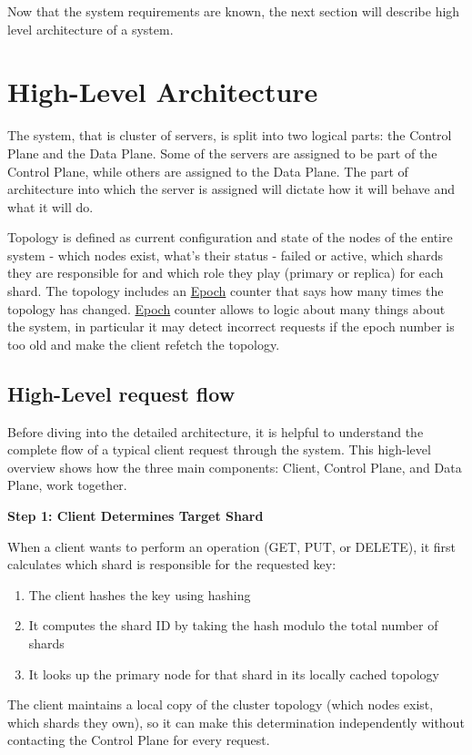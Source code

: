 \documentclass[shortabstract]{iithesis}
\begin{document}
Now that the system requirements are known, the next section will describe high level architecture of a system. 

\section{High-Level Architecture}
The system, that is cluster of servers, is split into two logical parts: the Control Plane and the Data Plane. Some of the servers are assigned to be part of the Control Plane, while others are assigned to the Data Plane. The part of architecture into which the server is assigned will dictate how it will behave and what it will do.

Topology is defined as current configuration and state of the nodes of the entire system - which nodes exist, what's their status - failed or active, which shards they are responsible for and which role they play (primary or replica) for each shard. The topology includes an \hyperref[def:epoch]{Epoch} counter that says how many times the topology has changed. \hyperref[def:epoch]{Epoch} counter allows to logic about many things about the system, in particular it may detect incorrect requests if the epoch number is too old and make the client refetch the topology.

\subsection{High-Level request flow}

Before diving into the detailed architecture, it is helpful to understand the complete flow of a typical client request through the system. This high-level overview shows how the three main components: Client, Control Plane, and Data Plane, work together.

\textbf{Step 1: Client Determines Target Shard}

When a client wants to perform an operation (GET, PUT, or DELETE), it first calculates which shard is responsible for the requested key:
\begin{enumerate}
    \item The client hashes the key using hashing
    \item It computes the shard ID by taking the hash modulo the total number of shards
    \item It looks up the primary node for that shard in its locally cached topology
\end{enumerate}

The client maintains a local copy of the cluster topology (which nodes exist, which shards they own), so it can make this determination independently without contacting the Control Plane for every request.
\end{document}
